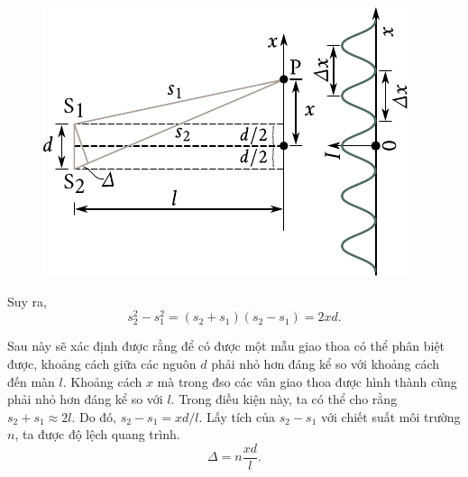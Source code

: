 \begin{figure}[!htb]
	\begin{center}
		\includegraphics[scale=0.95]{figures/ch_17/fig_17_2.pdf}
		\caption[]{}
		\label{fig:17_2}
	\end{center}
	\vspace{-0.9cm}
\end{figure}

\noindent
Suy ra,
\begin{equation*}
    s_2^2 - s_1^2 = (s_2 + s_1) (s_2 - s_1) = 2xd.
\end{equation*}

Sau này sẽ xác định được rằng để có được một mẫu giao thoa có thể phân biệt được, khoảng cách giữa các nguôn $d$ phải nhỏ hơn đáng kể so với khoảng cách đến màn $l$.
Khoảng cách $x$ mà trong đso các vân giao thoa được hình thành cũng phải nhỏ hơn đáng kể so với $l$.
Trong điều kiện này, ta có thể cho rằng $s_2+s_1 \approx 2l$.
Do đó, $s_2-s_1=xd/l$.
Lấy tích của $s_2-s_1$ với chiết suất môi trường $n$, ta được độ lệch quang trình.
\begin{equation}\label{eq:17_7}
    \Delta = n \frac{xd}{l}.
\end{equation}

